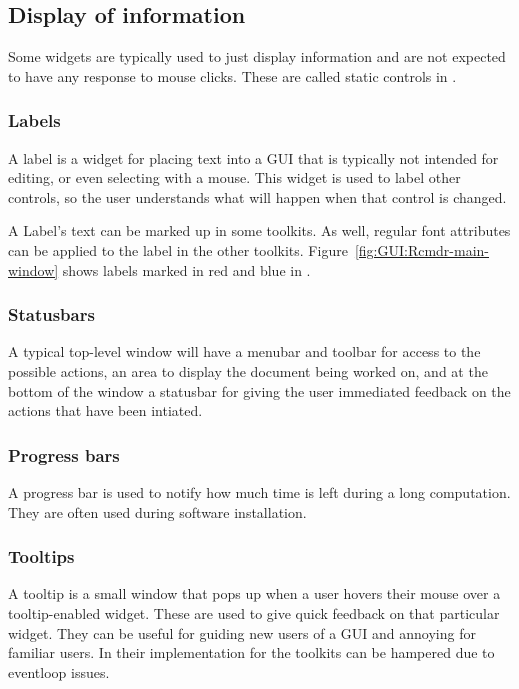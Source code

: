 \subsection{Display of information}
\label{sec:GUI:info-display}

Some widgets are typically used to just display information and are
not expected to have any response to mouse clicks. These are called
static controls in \wxWidgets. 

\subsubsection{Labels}
\label{sec:GUI:labels}
A label is a widget for placing text into a GUI that is typically not
intended for editing, or even selecting with a mouse. This widget is
used to label other controls, so the user understands what will happen
when that control is changed.

A Label's text can be marked up in some toolkits. As well, regular font attributes
can be applied to the label in the other
toolkits. Figure~\ref{fig:GUI:Rcmdr-main-window} shows labels marked in
red and blue in .

\subsubsection{Statusbars}
\label{sec:GUI:statusbars}

A typical top-level window will have a menubar and toolbar for access
to the possible actions, an area to display the document being worked
on, and at the bottom of the window a statusbar for giving the user
immediated feedback on the actions that have been
intiated. 

\subsubsection{Progress bars}

A progress bar is used to notify how much time is left during a long
computation. They are often used during software installation. 


\subsubsection{Tooltips}
\label{sec:GUI:basic-tooltips}

A tooltip is a small window that pops up when a user hovers their mouse
over a tooltip-enabled widget. These are used to give quick feedback
on that particular widget. They can be useful for guiding new users of
a GUI and  annoying for familiar users. In \R\/ their implementation
for the toolkits can be hampered due to eventloop issues.


